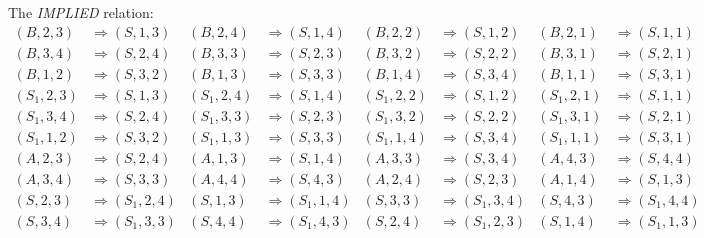 The \emph{IMPLIED} relation:
\begin{align*} %
(B,2,3)  & \Rightarrow (S,1,3)  & (B,2,4)  & \Rightarrow (S,1,4)  & (B,2,2)  & \Rightarrow (S,1,2) & (B,2,1)  & \Rightarrow (S,1,1)
\\
(B,3,4)  & \Rightarrow (S,2,4)  & (B,3,3)  & \Rightarrow (S,2,3)  & (B,3,2)  & \Rightarrow (S,2,2) & (B,3,1)  & \Rightarrow (S,2,1)
\\
(B,1,2)  & \Rightarrow (S,3,2)  & (B,1,3)  & \Rightarrow (S,3,3)  & (B,1,4)  & \Rightarrow (S,3,4) & (B,1,1)  & \Rightarrow (S,3,1)
\\ %
(S_1,2,3)  & \Rightarrow (S,1,3) & (S_1,2,4)  & \Rightarrow (S,1,4) & (S_1,2,2)  & \Rightarrow (S,1,2) & (S_1,2,1)  & \Rightarrow (S,1,1)
\\
(S_1,3,4)  & \Rightarrow (S,2,4)  & (S_1,3,3)  & \Rightarrow (S,2,3)  & (S_1,3,2)  & \Rightarrow (S,2,2) & (S_1,3,1)  & \Rightarrow (S,2,1)
\\
(S_1,1,2)  & \Rightarrow (S,3,2)  &  (S_1,1,3) & \Rightarrow (S,3,3)  & (S_1,1,4)  & \Rightarrow (S,3,4)  & (S_1,1,1)  & \Rightarrow (S,3,1)
\\ %
(A,2,3)  & \Rightarrow (S,2,4)    &  (A,1,3) & \Rightarrow (S,1,4)    & (A,3,3)  & \Rightarrow (S,3,4)    & (A,4,3)  & \Rightarrow (S,4,4)
\\
(A,3,4)  & \Rightarrow (S,3,3)    &  (A,4,4) & \Rightarrow (S,4,3)    & (A,2,4)  & \Rightarrow (S,2,3)    & (A,1,4)  & \Rightarrow (S,1,3)
\\ %
(S,2,3)  & \Rightarrow (S_1,2,4)  &  (S,1,3) & \Rightarrow (S_1,1,4)  & (S,3,3)  & \Rightarrow (S_1,3,4)  & (S,4,3)  & \Rightarrow (S_1,4,4)
\\
(S,3,4)  & \Rightarrow (S_1,3,3)  &  (S,4,4) & \Rightarrow (S_1,4,3)  & (S,2,4)  & \Rightarrow (S_1,2,3)  & (S,1,4)  & \Rightarrow (S_1,1,3)
\end{align*}


